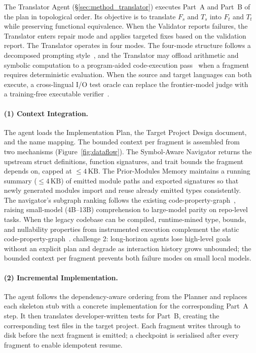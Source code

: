 The Translator Agent (§\ref{sec:method_translator}) executes Part~A and
Part~B of the plan in topological order. Its objective is to translate
$F_s$ and $T_s$ into $F_t$ and $T_t$ while preserving functional
equivalence. When the Validator reports failures, the Translator enters
repair mode and applies targeted fixes based on the validation report.
The Translator operates in four modes.
The four-mode structure follows a decomposed prompting
style~\cite{p62_decomposed_prompting}, and the Translator may offload
arithmetic and symbolic computation to a program-aided code-execution
pass~\cite{p65_gao_pal_2022} when a fragment requires deterministic
evaluation. When the source and target languages can both execute,
a cross-lingual I/O test oracle can replace the frontier-model judge
with a training-free executable verifier~\cite{p123_wang_codechemist_2026}.

\paragraph{(1) Context Integration.}
The agent loads the Implementation Plan, the Target Project Design
document, and the name mapping. The bounded context per fragment is
assembled from two mechanisms (Figure~\ref{fig:dataflow}). The
Symbol-Aware Navigator returns the upstream struct definitions,
function signatures, and trait bounds the fragment depends on, capped
at $\le 4\,\text{KB}$. The Prior-Modules Memory maintains a running
summary ($\le 4\,\text{KB}$) of emitted module paths and exported
signatures so that newly generated modules import and reuse already
emitted types consistently. The navigator's subgraph ranking follows
the existing code-property-graph~\cite{p110_graphcoder_2024,p113_zhang_autocoderover_2024,p116_gauthier_aider_2024,p117_zhang_repocoder_2023,p120_yang_swesmith_2025,p124_shetty_syzygy_2025}, raising small-model (4B--13B) comprehension to large-model parity on repo-level tasks. When the legacy codebase can be compiled, runtime-mined type, bounds, and nullability properties from instrumented execution complement the static code-property-graph~\cite{p124_shetty_syzygy_2025}.
challenge 2: long-horizon agents lose high-level goals without an
explicit plan and degrade as interaction history grows unbounded; the
bounded context per fragment prevents both failure modes on small
local models.

\paragraph{(2) Incremental Implementation.}
The agent follows the dependency-aware ordering from the Planner and
replaces each skeleton stub with a concrete implementation for the
corresponding Part~A step. It then translates developer-written tests
for Part~B, creating the corresponding test files in the target
project. Each fragment writes through to disk before the next
fragment is emitted; a checkpoint is serialised after every fragment
to enable idempotent resume.

